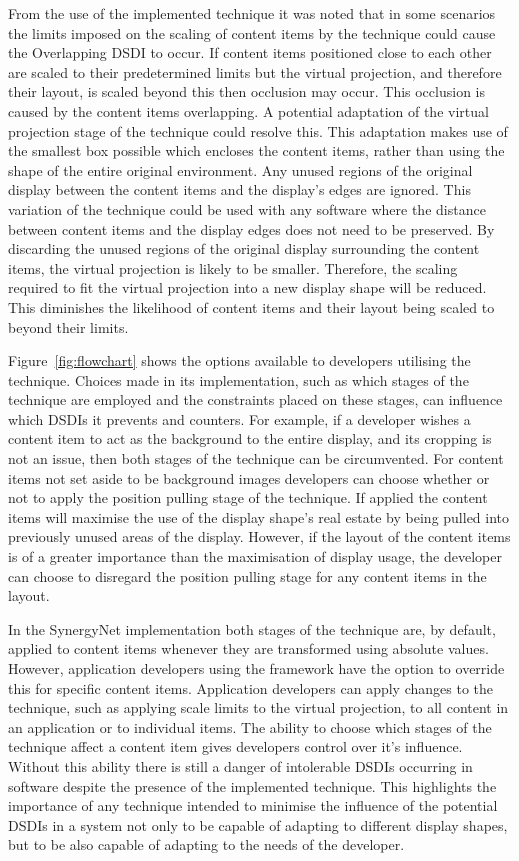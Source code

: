 \documentclass[review,5p,times,twocolumn]{elsarticle}
\begin{document}
From the use of the implemented technique it was noted that in some scenarios the limits imposed on the scaling of content items by the technique could cause the Overlapping \ac{DSDI} to occur.
If content items positioned close to each other are scaled to their predetermined limits but the virtual projection, and therefore their layout, is scaled beyond this then occlusion may occur.
This occlusion is caused by the content items overlapping.
A potential adaptation of the virtual projection stage of the technique could resolve this.  
This adaptation makes use of the smallest box possible which encloses the content items, rather than using the shape of the entire original environment.
Any unused regions of the original display between the content items and the display's edges are ignored.
This variation of the technique could be used with any software where the distance between content items and the display edges does not need to be preserved.
By discarding the unused regions of the original display surrounding the content items, the virtual projection is likely to be smaller.
Therefore, the scaling required to fit the virtual projection into a new display shape will be reduced.
This diminishes the likelihood of content items and their layout being scaled to beyond their limits. 

Figure~\ref{fig:flowchart} shows the options available to developers utilising the technique.
Choices made in its implementation, such as which stages of the technique are employed and the constraints placed on these stages, can influence which \acp{DSDI} it prevents and counters.
For example, if a developer wishes a content item to act as the background to the entire display, and its cropping is not an issue, then both stages of the technique can be circumvented.
For content items not set aside to be background images developers can choose whether or not to apply the position pulling stage of the technique.
If applied the content items will maximise the use of the display shape's real estate by being pulled into previously unused areas of the display.
However, if the layout of the content items is of a greater importance than the maximisation of display usage, the developer can choose to disregard the position pulling stage for any content items in the layout.

In the SynergyNet implementation both stages of the technique are, by default, applied to content items whenever they are transformed using absolute values.
However, application developers using the framework have the option to override this for specific content items.
Application developers can apply changes to the technique, such as applying scale limits to the virtual projection, to all content in an application or to individual items.
The ability to choose which stages of the technique affect a content item gives developers control over it's influence.
Without this ability there is still a danger of intolerable \acp{DSDI} occurring in software despite the presence of the implemented technique.
This highlights the importance of any technique intended to minimise the influence of the potential \acp{DSDI} in a system not only to be capable of adapting to different display shapes, but to be also capable of adapting to the needs of the developer.
\end{document}
